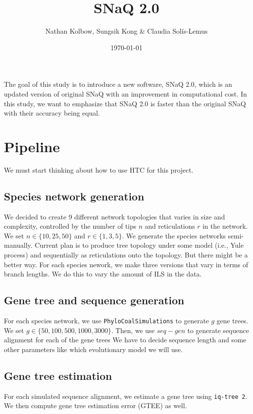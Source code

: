 \documentclass{article}
\title{SNaQ 2.0}
\author{Nathan Kolbow, Sungsik Kong \& Claudia Solís-Lemus}
\date{\today}
\newcommand{\kevin}{\color{blue}}
\begin{document}
\maketitle

The goal of this study is to introduce a new software, SNaQ 2.0, which is an updated version of original SNaQ with an improvement in computational cost. In this study, we want to emphasize that SNaQ 2.0 is faster than the original SNaQ with their accuracy being equal.

\section{Pipeline}

{\kevin We must start thinking about how to use HTC for this project.}

\subsection{Species network generation}
We decided to create 9 different network topologies that varies in size and complexity, controlled by the number of tips $n$ and reticulations $r$ in the network. We set $n \in \{10, 25, 50\}$ and $r \in \{1, 3, 5\}$. We generate the species networks semi-manually. Current plan is to produce tree topology under some model (i.e., Yule process) and sequentially as reticulations onto the topology. But there might be a better way. For each species nework, we make three versions that vary in terms of branch lengths. We do this to vary the amount of ILS in the data.

\subsection{Gene tree and sequence generation}
For each species network, we use \texttt{PhyloCoalSimulations} to generate $g$ gene trees. We set $g \in \{50, 100, 500, 1000, 3000\}$. Then, we use $seq-gen$ to generate sequence alignment for each of the gene trees {\kevin We have to decide sequence length and some other parameters like which evolutionary model we will use.}

\subsection{Gene tree estimation}
For each simulated sequence alignment, we estimate a gene tree using \texttt{iq-tree 2}. We then compute gene tree estimation error (GTEE) as well.
\end{document}
